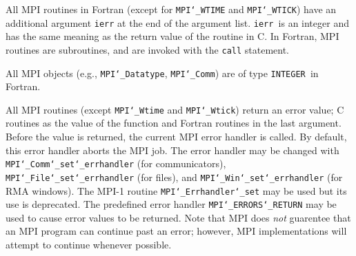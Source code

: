 All MPI routines in Fortran (except for {\tt MPI{\tt \char`\_}WTIME} and {\tt MPI{\tt \char`\_}WTICK}) have
an additional argument {\tt ierr} at the end of the argument list.  {\tt ierr
}is an integer and has the same meaning as the return value of the routine
in C.  In Fortran, MPI routines are subroutines, and are invoked with the
{\tt call} statement.
\par
All MPI objects (e.g., {\tt MPI{\tt \char`\_}Datatype}, {\tt MPI{\tt \char`\_}Comm}) are of type {\tt INTEGER
}in Fortran.
\par
{}
\par
All MPI routines (except {\tt MPI{\tt \char`\_}Wtime} and {\tt MPI{\tt \char`\_}Wtick}) return an error value;
C routines as the value of the function and Fortran routines in the last
argument.  Before the value is returned, the current MPI error handler is
called.  By default, this error handler aborts the MPI job.  The error handler
may be changed with {\tt MPI{\tt \char`\_}Comm{\tt \char`\_}set{\tt \char`\_}errhandler} (for communicators),
{\tt MPI{\tt \char`\_}File{\tt \char`\_}set{\tt \char`\_}errhandler} (for files), and {\tt MPI{\tt \char`\_}Win{\tt \char`\_}set{\tt \char`\_}errhandler} (for
RMA windows).  The MPI-1 routine {\tt MPI{\tt \char`\_}Errhandler{\tt \char`\_}set} may be used but
its use is deprecated.  The predefined error handler
{\tt MPI{\tt \char`\_}ERRORS{\tt \char`\_}RETURN} may be used to cause error values to be returned.
Note that MPI does {\em not} guarentee that an MPI program can continue past
an error; however, MPI implementations will attempt to continue whenever
possible.
\par
{}
\endmanpage
